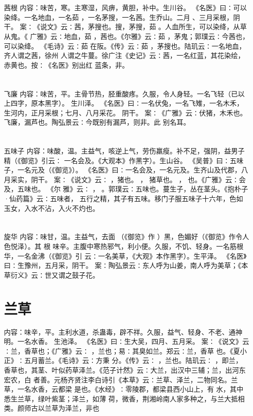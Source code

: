 \documentclass[12pt,UTF8]{ctexbook}
\begin{document}
\section{}茜根
内容：味苦，寒。主寒湿，风痹，黄胆，补中。生川谷。 
《名医》曰∶可以染绛。一名地血，一名茹 ，一名茅搜，一名茜。生乔山。二月 
、三月采根，阴干。 
案∶《说文》云∶茜，茅搜也。搜，茅搜，茹 。人血所生，可以染绛，从草从鬼。《 
广雅》云∶地血，茹 ，茜也。《尔雅》云∶茹 ，茅鬼；郭璞云∶今茜也，可以染绛。 
《毛诗》云∶茹 在阪。《传》云∶茹 ，茅搜也。陆玑云∶一名地血，齐人谓之茜，徐州 
人谓之牛蔓。徐广注《史记》云∶茜，一名红蓝，其花染绘，赤黄也。按∶《名医》别出红 
蓝条，非。 


\section{}飞廉
内容：味苦，平。主骨节热，胫重酸疼。久服，令人身轻。一名飞轻（已以上四字，原本黑字）。 
生川泽。 
《名医》曰∶一名伏兔，一名飞雉，一名木禾，生河内，正月采根；七月、八月采花。 
阴干。 
案∶《广雅》云∶伏猪，木禾也。飞廉，漏芦也。陶弘景云∶今既别有漏芦，则非。此 
别名耳。 


\section{}五味子
内容：味酸，温。主益气，咳逆上气，劳伤羸瘦。补不足，强阴，益男子精（《御览》引云∶ 
一名会及。《大观本》作黑字）。生山谷。 
《吴普》曰∶五味子，一名元及（《御览》）。 
《名医》曰∶一名会及，一名元及。生齐山及代郡，八月采实，阴干。 
案∶《说文》云∶ ，猪也。 ， 猪草也。 ， 也。《广雅》云∶会及，五味也。 
《尔 
雅》云∶ ， 。郭璞云∶五味也。蔓生子，丛在茎头。《抱朴子·仙药篇》云∶五味者， 
五行之精，其子有五味。移门子服五味子十六年，色如玉女，入水不沾，入火不灼也。 


\section{}旋华
内容：味甘，温。主益气，去面 （《御览》作 ）黑，色媚好（《御览》作令人色悦泽）。其 
根 
味辛。主腹中寒热邪气，利小便。久服，不饥、轻身。一名筋根华，一名金沸（《御览》引 
云∶一名美草，《大观》本作黑字）。生平泽。 
《名医》曰∶生豫州，五月采，阴干。 
案∶陶弘景云∶东人呼为山姜，南人呼为美草；《本草衍义》云∶世又谓之鼓子花。 


\section{兰草}
内容：味辛，平。主利水道，杀蛊毒，辟不祥。久服，益气、轻身、不老、通神明。一名水香。 
生池泽。 
《名医》曰∶生大吴，四月、五月采。 
案∶《说文》云∶兰，香草也；《广雅》云∶ ，兰也；易∶其臭如兰。郑云∶兰，香草 
也。《夏小正》∶五月蓄兰。《毛诗》云∶方秉 分。《传》云∶ ，兰也。陆玑云∶ ，即兰， 
香草也，其茎、叶似药草泽兰。《范子计然》云∶大兰，出汉中三辅；兰，出河东宏农，白 
者善。元杨齐贤注李白诗引《本草》云∶兰草、泽兰，二物同名。兰草，一名水香，云都梁 
是也。《水经》∶零陵郡，都梁县西小山上，有 水，其中悉生兰草，绿叶紫茎；泽兰，如薄 
荷，微香，荆湘岭南人家多种之，与兰大抵相类。颜师古以兰草为泽兰，非也 
\end{document}
